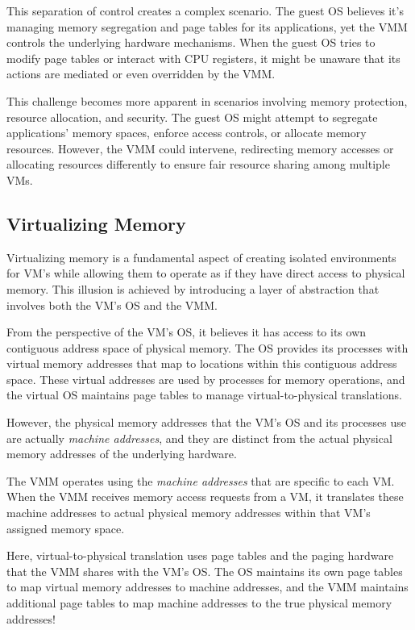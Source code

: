 \documentclass{report}
\newcommand{\abstractionBegin}[1]{\begin{tcolorbox}[colback=violet!5!white,colframe=violet,title={Abstraction:
      #1}]}
\newcommand{\abstractionEnd}{\end{tcolorbox}}
\begin{document}
This separation of control creates a complex scenario. The guest OS believes it's managing memory
segregation and page tables for its applications, yet the VMM controls the underlying hardware
mechanisms. When the guest OS tries to modify page tables or interact with CPU registers, it might
be unaware that its actions are mediated or even overridden by the VMM. 

This challenge becomes more apparent in scenarios involving memory protection, resource allocation,
and security. The guest OS might attempt to segregate applications' memory spaces, enforce access
controls, or allocate memory resources. However, the VMM could intervene, redirecting memory
accesses or allocating resources differently to ensure fair resource sharing among multiple VMs.

\subsection{Virtualizing Memory}
\abstractionBegin{Virtualizing Memory (Round II)}
Virtualizing memory is a fundamental aspect of creating isolated environments for VM's
while allowing them to operate as if they have direct access to physical memory. This illusion
is achieved by introducing a layer of abstraction that involves both the VM's OS and the VMM.
\abstractionEnd

From the perspective of the VM's OS, it believes it has access to its own contiguous address space
of physical memory. The OS provides its processes with virtual memory addresses that map to
locations within this contiguous address space. These virtual addresses are used by processes for
memory operations, and the virtual OS maintains page tables to manage virtual-to-physical
translations.

However, the physical memory addresses that the VM's OS and its processes use are actually
\textit{machine addresses}, and they are distinct from the actual physical memory addresses of the
underlying hardware.

The VMM operates using the \textit{machine addresses} that are specific to each VM. When the VMM
receives memory access requests from a VM, it translates these machine addresses to actual physical
memory addresses within that VM's assigned memory space.

Here, virtual-to-physical translation uses page tables and the paging hardware that the VMM shares
with the VM's OS. The OS maintains its own page tables to map virtual memory addresses to machine
addresses, and the VMM maintains additional page tables to map machine addresses to the true
physical memory addresses!
\end{document}
